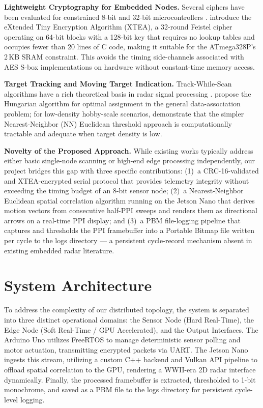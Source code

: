 \documentclass[14pt]{article}
\begin{document}
\textbf{Lightweight Cryptography for Embedded Nodes.}
Several ciphers have been evaluated for constrained 8-bit and 32-bit
microcontrollers \citep{Beaulieu2015, Dinu2015}. \citet{Wheeler1997} introduce
the eXtended Tiny Encryption Algorithm (XTEA), a 32-round Feistel cipher
operating on 64-bit blocks with a 128-bit key that requires no lookup tables
and occupies fewer than 20 lines of C code, making it suitable for the
ATmega328P's 2\,KB SRAM constraint. This avoids the timing side-channels
associated with AES S-box implementations on hardware without constant-time
memory access.

\textbf{Target Tracking and Moving Target Indication.}
Track-While-Scan algorithms have a rich theoretical basis in radar signal
processing \citep{Blackman1986, Bar-Shalom2011}. \citet{Kuhn1955} propose the
Hungarian algorithm for optimal assignment in the general data-association
problem; for low-density hobby-scale scenarios, \citet{Streit1994} demonstrate
that the simpler Nearest-Neighbor (NN) Euclidean threshold approach is
computationally tractable and adequate when target density is low.

\textbf{Novelty of the Proposed Approach.}
While existing works typically address either basic single-node scanning or
high-end edge processing independently, our project bridges this gap with
three specific contributions: (1)~a CRC-16-validated and XTEA-encrypted
serial protocol that provides telemetry integrity without exceeding the
timing budget of an 8-bit sensor node; (2)~a Nearest-Neighbor Euclidean
spatial correlation algorithm running on the Jetson Nano that derives
motion vectors from consecutive half-PPI sweeps and renders them as
directional arrows on a real-time PPI display; and (3)~a PBM file-logging pipeline that captures and thresholds the PPI
framebuffer into a Portable Bitmap file written per cycle to the logs
directory --- a persistent cycle-record mechanism absent in existing embedded
radar literature.



\section{System Architecture}
To address the complexity of our distributed topology, the system is separated into three distinct operational domains: the Sensor Node (Hard Real-Time), the Edge Node (Soft Real-Time / GPU Accelerated), and the Output Interfaces. The Arduino Uno utilizes FreeRTOS to manage deterministic sensor polling and motor actuation, transmitting encrypted packets via UART. The Jetson Nano ingests this stream, utilizing a custom C++ backend and Vulkan API pipeline to offload spatial correlation to the GPU, rendering a WWII-era 2D radar interface dynamically. Finally, the processed framebuffer is extracted, thresholded to 1-bit monochrome, and saved as a PBM file to the logs directory for persistent cycle-level logging.
\end{document}
